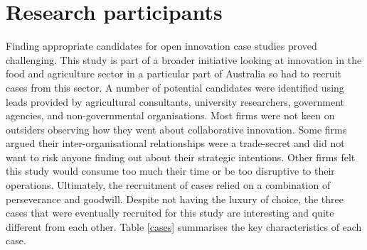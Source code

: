 \section{Research participants}

Finding appropriate candidates for open innovation case studies proved challenging. This study is part of a broader initiative looking at innovation in the food and agriculture sector in a particular part of Australia so had to recruit cases from this sector. A number of potential candidates were identified using leads provided by agricultural consultants, university researchers, government agencies, and non-governmental organisations. Most firms were not keen on outsiders observing how they went about collaborative innovation. Some firms argued their inter-organisational relationships were a trade-secret and did not want to risk anyone finding out about their strategic intentions. Other firms felt this study would consume too much their time or be too disruptive to their operations. Ultimately, the recruitment of cases relied on a combination of perseverance and goodwill. Despite not having the luxury of choice, the three cases that were eventually recruited for this study are interesting and quite different from each other. Table \ref{cases} summarises the key characteristics of each case.\medskip

